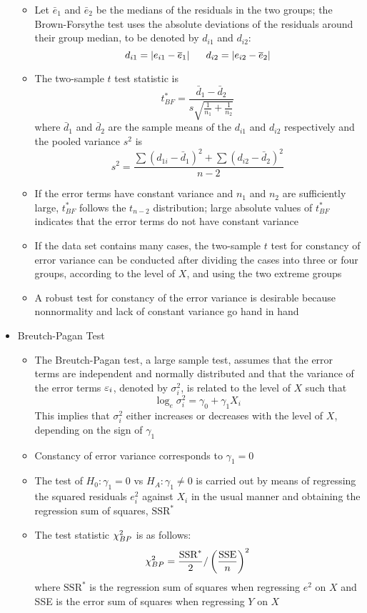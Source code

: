 \begin{itemize}
\begin{itemize}
\item Let $\bar{e}_1$ and $\bar{e}_2$ be the medians of the residuals in the two groups; the Brown-Forsythe test uses the absolute deviations of the residuals around their group median, to be denoted by $d_{i1}$ and $d_{i2}$: $$ d_{i1} = \abs{e_{i1} - \overline{e}_1} ~~~~~ d_{i2} = \abs{e_{i2} - \overline{e}_2} $$ 
\item The two-sample $t$ test statistic is $$ t^*_{BF} = \frac{\bar{d}_1 - \bar{d}_2}{s\sqrt{\frac{1}{n_1} + \frac{1}{n_2}}} $$ where $\bar{d}_1$ and $\bar{d}_2$ are the sample means of the $d_{i1}$ and $d_{i2}$ respectively and the pooled variance $s^2$ is $$ s^2 = \frac{\sum (d_{1i} - \bar{d}_1)^2 + \sum (d_{i2} - \bar{d}_2)^2}{n-2} $$ 
\item If the error terms have constant variance and $n_1$ and $n_2$ are sufficiently large, $t^*_{BF}$ follows the $t_{n-2}$ distribution; large absolute values of $t^*_{BF}$ indicates that the error terms do not have constant variance 
\item If the data set contains many cases, the two-sample $t$ test for constancy of error variance can be conducted after dividing the cases into three or four groups, according to the level of $X$, and using the two extreme groups 
\item A robust test for constancy of the error variance is desirable because nonnormality and lack of constant variance go hand in hand 
\end{itemize} 
\item Breutch-Pagan Test \begin{itemize} 
\item The Breutch-Pagan test, a large sample test, assumes that the error terms are independent and normally distributed and that the variance of the error terms $\varepsilon_i$, denoted by $\sigma^2_i$, is related to the level of $X$ such that $$ \log_e \sigma_i^2 = \gamma_0 + \gamma_1X_i $$ This implies that $\sigma^2_i$ either increases or decreases with the level of $X$, depending on the sign of $\gamma_1$ 
\item Constancy of error variance corresponds to $\gamma_1 = 0$ 
\item The test of $H_0: \gamma_1 = 0$ vs $H_A: \gamma_1 \neq 0$ is carried out by means of regressing the squared residuals $e_i^2$ against $X_i$ in the usual manner and obtaining the regression sum of squares, $\text{SSR}^*$
\item The test statistic $\chi^2_{BP}$ is as follows: $$ \chi^2_{BP} = \frac{\text{SSR}^*}{2} / \left( \frac{\text{SSE}}{n}\right)^2 $$ where $\text{SSR}^*$ is the regression sum of squares when regressing $e^2$ on $X$ and SSE is the error sum of squares when regressing $Y$ on $X$ 

\end{itemize}
\end{itemize}
